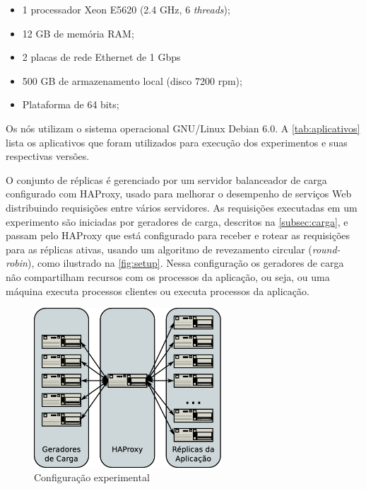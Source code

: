 \begin{itemize}
  \item 1 processador Xeon E5620 (2.4 GHz, 6 \emph{threads});
  \item 12 GB de memória RAM;
  \item 2 placas de rede Ethernet de 1 Gbps
  \item 500 GB de armazenamento local (disco 7200 rpm);
  \item Plataforma de 64 bits;
\end{itemize}

Os nós utilizam o sistema operacional GNU/Linux Debian 6.0. A \autoref{tab:aplicativos}
lista os aplicativos que foram utilizados para execução dos experimentos e suas
respectivas versões.

\begin{table}[htb]
\end{table}

O conjunto de réplicas é gerenciado por um servidor balanceador de carga configurado com
HAProxy, usado para melhorar o desempenho de serviços Web distribuindo requisições entre
vários servidores. As requisições executadas em um experimento são iniciadas por geradores
de carga, descritos na \autoref{subsec:carga}, e passam pelo HAProxy que está configurado
para receber e rotear as requisições para as réplicas ativas, usando um algoritmo de
revezamento circular (\emph{round-robin}), como ilustrado na \autoref{fig:setup}. Nessa
configuração os geradores de carga não compartilham recursos com os processos da
aplicação, ou seja, ou uma máquina executa processos clientes ou executa processos da
aplicação.

\begin{figure}[ht]
  \centering
  \includegraphics[width=7cm]{conteudo/capitulos/figuras/experimental-setup.dia.eps}
  \caption{Configuração experimental}
  \label{fig:setup}
\end{figure}

